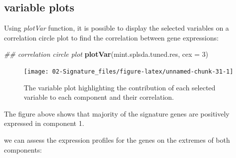 \documentclass[]{book}
\newenvironment{Shaded}{\begin{snugshade}}{\end{snugshade}}
\newcommand{\CommentTok}[1]{\textcolor[rgb]{0.56,0.35,0.01}{\textit{#1}}}
\newcommand{\DataTypeTok}[1]{\textcolor[rgb]{0.13,0.29,0.53}{#1}}
\newcommand{\DecValTok}[1]{\textcolor[rgb]{0.00,0.00,0.81}{#1}}
\newcommand{\KeywordTok}[1]{\textcolor[rgb]{0.13,0.29,0.53}{\textbf{#1}}}
\newcommand{\NormalTok}[1]{#1}
\newcommand{\OperatorTok}[1]{\textcolor[rgb]{0.81,0.36,0.00}{\textbf{#1}}}
\newcommand{\StringTok}[1]{\textcolor[rgb]{0.31,0.60,0.02}{#1}}
\theoremstyle{definition}
\theoremstyle{definition}
\theoremstyle{definition}
\theoremstyle{remark}
\begin{document}
\hypertarget{variable-plots}{%
\subsection{variable plots}\label{variable-plots}}

Using \emph{plotVar} function, it is possible to display the selected
variables on a correlation circle plot to find the correlation between
gene expressions:

\begin{Shaded}
\begin{Highlighting}[]
\CommentTok{## correlation circle plot}
\KeywordTok{plotVar}\NormalTok{(mint.splsda.tuned.res, }\DataTypeTok{cex =} \DecValTok{3}\NormalTok{)}
\end{Highlighting}
\end{Shaded}

\begin{figure}[ht]

{\centering \texttt{[image: 02-Signature\_files/figure-latex/unnamed-chunk-31-1]} 

}

\caption{The variable plot highlighting the contribution of each selected variable to each component and their correlation.}\label{fig:unnamed-chunk-31}
\end{figure}

The figure above shows that majority of the signature genes are
positively expressed in component 1.

we can assess the expression profiles for the genes on the extremes of
both components:

\begin{Shaded}
\end{Shaded}
\end{document}
